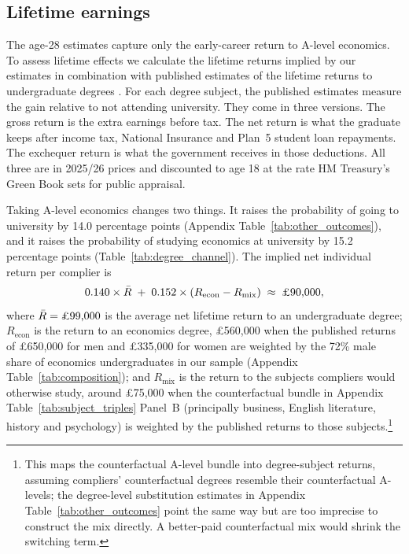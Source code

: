 \subsection{Lifetime earnings}
\label{sec:lifetime}

The age-28 estimates capture only the early-career return to A-level economics. To assess lifetime effects we calculate the lifetime returns implied by our estimates in combination with published estimates of the lifetime returns to undergraduate degrees \citep{britton2026lifetime}. For each degree subject, the published estimates measure the gain relative to not attending university. They come in three versions. The gross return is the extra earnings before tax. The net return is what the graduate keeps after income tax, National Insurance and Plan~5 student loan repayments. The exchequer return is what the government receives in those deductions. All three are in 2025/26 prices and discounted to age 18 at the rate HM Treasury's Green Book sets for public appraisal.

Taking A-level economics changes two things. It raises the probability of going to university by 14.0 percentage points (Appendix Table~\ref{tab:other_outcomes}), and it raises the probability of studying economics at university by 15.2 percentage points (Table~\ref{tab:degree_channel}). The implied net individual return per complier is
%
\begin{equation}
\label{eq:implied}
0.140 \times \bar{R} \;+\; 0.152 \times \left(R_{\text{econ}} - R_{\text{mix}}\right) \;\approx\; \text{\pounds 90,000},
\end{equation}
%
where $\bar{R} = \text{\pounds 99,000}$ is the average net lifetime return to an undergraduate degree; $R_{\text{econ}}$ is the return to an economics degree, \pounds 560,000 when the published returns of \pounds 650,000 for men and \pounds 335,000 for women are weighted by the 72\% male share of economics undergraduates in our sample (Appendix Table~\ref{tab:composition}); and $R_{\text{mix}}$ is the return to the subjects compliers would otherwise study, around \pounds 75,000 when the counterfactual bundle in Appendix Table~\ref{tab:subject_triples} Panel~B (principally business, English literature, history and psychology) is weighted by the published returns to those subjects.\footnote{This maps the counterfactual A-level bundle into degree-subject returns, assuming compliers' counterfactual degrees resemble their counterfactual A-levels; the degree-level substitution estimates in Appendix Table~\ref{tab:other_outcomes} point the same way but are too imprecise to construct the mix directly. A better-paid counterfactual mix would shrink the switching term.}

